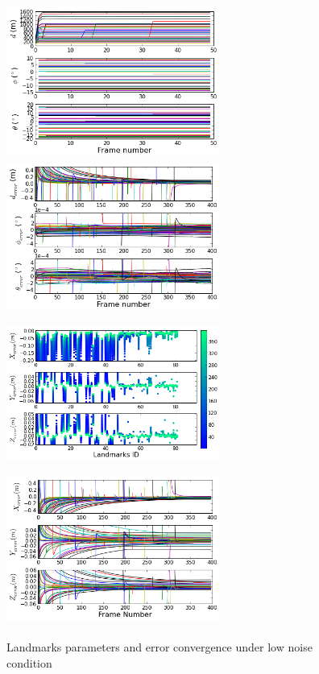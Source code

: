 \begin{figure}[h]
\centering
\includegraphics[width=7cm, height=5cm]{./Figures/SimulationFigures/Figure6.png}
\includegraphics[width=7cm, height=5cm]{./Figures/SimulationFigures/Figure7.png}
\includegraphics[width=7cm, height=5cm]{./Figures/SimulationFigures/Figure5.png}
\includegraphics[width=7cm, height=5cm]{./Figures/SimulationFigures/Figure8.png}
\caption{Landmarks parameters and error convergence under low noise condition}
\label{fig:simfig5-8}
\end{figure}

